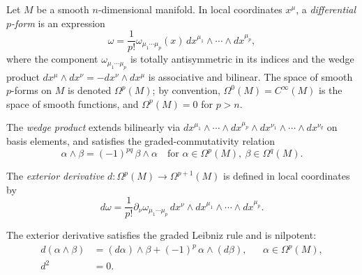 \documentclass[11pt]{article}
\theoremstyle{definition}
\numberwithin{theorem}{section}
\numberwithin{equation}{section}
\let\del\partial
\begin{document}
Let $M$ be a smooth $n$-dimensional manifold. In local coordinates $x^\mu$, a \emph{differential $p$-form} is an expression
\begin{equation}
\omega = \frac{1}{p!}\omega_{\mu_1\cdots \mu_p}(x)\, dx^{\mu_1}\wedge \cdots \wedge dx^{\mu_p},
\end{equation}
where the component $\omega_{\mu_1\cdots\mu_p}$ is totally antisymmetric in its indices and the wedge product $dx^\mu \wedge dx^\nu = -dx^\nu \wedge dx^\mu$ is associative and bilinear. The space of smooth $p$-forms on $M$ is denoted $\Omega^p(M)$; by convention, $\Omega^0(M) = C^\infty(M)$ is the space of smooth functions, and $\Omega^p(M) = 0$ for $p>n$.

\medskip

\noindent The \emph{wedge product} extends bilinearly via $dx^{\mu_1}\wedge\cdots \wedge dx^{\mu_p}\wedge dx^{\nu_1}\wedge \cdots \wedge dx^{\nu_q}$ on basis elements, and satisfies the graded-commutativity relation
\begin{equation}\label{eq:graded-comm}
\alpha \wedge \beta = (-1)^{pq}\, \beta \wedge \alpha \quad\text{for } \alpha\in \Omega^p(M),\ \beta \in \Omega^q(M).
\end{equation}

\medskip

\noindent The \emph{exterior derivative} $d:\Omega^p(M) \to \Omega^{p+1}(M)$ is defined in local coordinates by
\begin{equation}
d\omega = \frac{1}{p!}\del_\nu \omega_{\mu_1\cdots \mu_p}\, dx^\nu \wedge dx^{\mu_1}\wedge \cdots \wedge dx^{\mu_p}.
\end{equation}

\begin{lemma}\label{lem:leibniz-nilpotent}
The exterior derivative satisfies the graded Leibniz rule and is nilpotent:
\begin{align}
d(\alpha \wedge \beta) &= (d\alpha)\wedge \beta + (-1)^p\, \alpha \wedge (d\beta), &&\alpha\in \Omega^p(M),\label{eq:leibniz}\\
d^2 &= 0.\label{eq:nilpotent}
\end{align}
\end{lemma}
\end{document}
